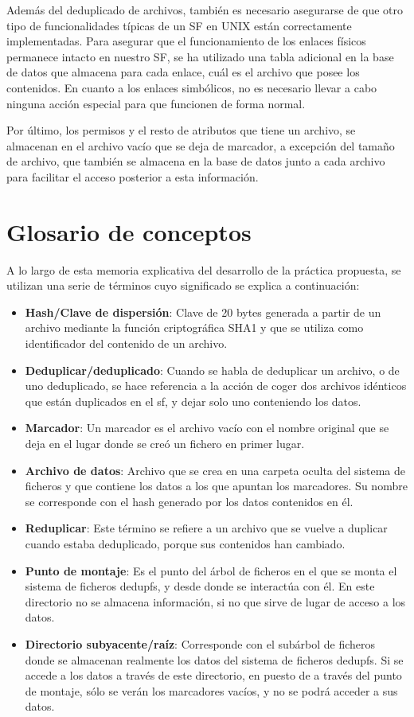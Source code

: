 \documentclass[12pt,a4paper]{article}
\begin{document}
Además del deduplicado de archivos, también es necesario asegurarse de que otro tipo de funcionalidades típicas de un SF en UNIX están correctamente implementadas. Para asegurar que el funcionamiento de los enlaces físicos permanece intacto en nuestro SF, se ha utilizado una tabla adicional en la base de datos que almacena para cada enlace, cuál es el archivo que posee los contenidos. En cuanto a los enlaces simbólicos, no es necesario llevar a cabo ninguna acción especial para que funcionen de forma normal.

Por último, los permisos y el resto de atributos que tiene un archivo, se almacenan en el archivo vacío que se deja de marcador, a excepción del tamaño de archivo, que también se almacena en la base de datos junto a cada archivo para facilitar el acceso posterior a esta información.

\newpage
\section{Glosario de conceptos}

A lo largo de esta memoria explicativa del desarrollo de la práctica propuesta, se utilizan una serie de términos cuyo significado se explica a continuación:
\begin{itemize}
 \item \textbf{Hash/Clave de dispersión}: Clave de 20 bytes generada a partir de un archivo mediante la función criptográfica SHA1 y que se utiliza como identificador del contenido de un archivo.
 \item \textbf{Deduplicar/deduplicado}: Cuando se habla de deduplicar un archivo, o de uno deduplicado, se hace referencia a la acción de coger dos archivos idénticos que están duplicados en el sf, y dejar solo uno conteniendo los datos.
 \item \textbf{Marcador}: Un marcador es el archivo vacío con el nombre original que se deja en el lugar donde se creó un fichero en primer lugar.
 \item \textbf{Archivo de datos}: Archivo que se crea en una carpeta oculta del sistema de ficheros y que contiene los datos a los que apuntan los marcadores. Su nombre se corresponde con el hash generado por los datos contenidos en él.
 \item \textbf{Reduplicar}: Este término se refiere a un archivo que se vuelve a duplicar cuando estaba deduplicado, porque sus contenidos han cambiado.
 \item \textbf{Punto de montaje}: Es el punto del árbol de ficheros en el que se monta el sistema de ficheros dedupfs, y desde donde se interactúa con él. En este directorio no se almacena información, si no que sirve de lugar de acceso a los datos.
 \item \textbf{Directorio subyacente/raíz}: Corresponde con el subárbol de ficheros donde se almacenan realmente los datos del sistema de ficheros dedupfs. Si se accede a los datos a través de este directorio, en puesto de a través del punto de montaje, sólo se verán los marcadores vacíos, y no se podrá acceder a sus datos.
\end{itemize}
\end{document}
